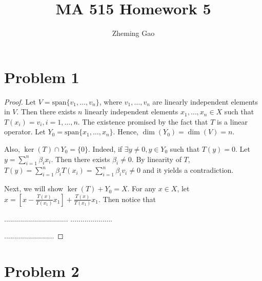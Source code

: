 \documentclass[12pt]{article}
\begin{document}
 
 
\title{MA 515 Homework 5}
\author{Zheming Gao}
\maketitle

\section*{Problem 1}

\begin{proof}

Let $V = \text{span}\{v_1, \dots, v_n\}$, where $v_1, \dots, v_n$ are linearly independent elements in $V$. Then there exists $n$ linearly independent elements $x_1, \dots, x_n \in X$ such that $T(x_i) = v_i, i = 1, \dots, n$. The existence promised by the fact that $T$ is a linear operator. Let $Y_0 = \text{span}\{x_1, \dots, x_n\}$. Hence, $\dim(Y_0) = \dim(V) = n$.

Also, $\ker(T) \cap Y_0 = \{0\}$. Indeed, if $\exists y\neq 0, y\in Y_0$ such that $T(y)=0$. Let $y = \sum_{i=1}^n \beta_i x_i$. Then there exists $\beta_i \neq 0$. By linearity of $T$, $T(y) = \sum_{i=1}^n \beta_i T(x_i) = \sum_{i=1}^n \beta_i v_i \neq 0$ and it yields a contradiction.

Next, we will show $\ker(T) + Y_0 = X$. For any $x\in X$, let $x = \left[x-\frac{T(x)}{T(x_1)}x_1\right] + \frac{T(x)}{T(x_1)}x_1$. Then notice that 



................................
.....................

.........................
\end{proof}


\section*{Problem 2}
\end{document}
